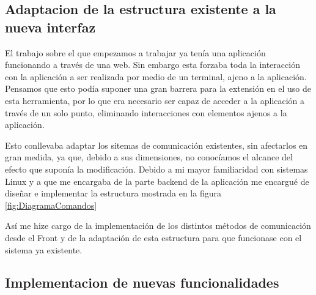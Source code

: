 \subsection*{Adaptacion de la estructura existente a la nueva interfaz}

El trabajo sobre el que empezamos a trabajar ya tenía una aplicación funcionando a través de una web. Sin embargo esta forzaba toda la interacción con la aplicación a ser realizada por medio de un terminal, ajeno a la aplicación. Pensamos que esto podía suponer una gran barrera para la extensión en el uso de esta herramienta, por lo que era necesario ser capaz de acceder a la aplicación a través de un solo punto, eliminando interacciones con elementos ajenos a la aplicación.

Esto conllevaba adaptar los sitemas de comunicación existentes, sin afectarlos en gran medida, ya que, debido a sus dimensiones, no conocíamos el alcance del efecto que suponía la modificación. Debido a mi mayor familiaridad con sistemas Linux y a que me encargaba de la parte backend de la aplicación me encargué de diseñar e implementar la estructura mostrada en la figura \ref{fig:DiagramaComandos}

Así me hize cargo de la implementación de los distintos métodos de comunicación desde el Front y de la adaptación de esta estructura para que funcionase con el sistema ya existente.

\subsection*{Implementacion de nuevas funcionalidades}

